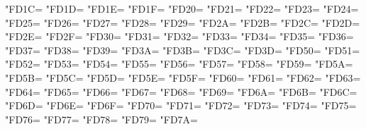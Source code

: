 \XeTeXcharclass"FD1C=\KclassArabU
\XeTeXcharclass"FD1D=\KclassArabU
\XeTeXcharclass"FD1E=\KclassArabU
\XeTeXcharclass"FD1F=\KclassArabU
\XeTeXcharclass"FD20=\KclassArabU
\XeTeXcharclass"FD21=\KclassArabU
\XeTeXcharclass"FD22=\KclassArabU
\XeTeXcharclass"FD23=\KclassArabU
\XeTeXcharclass"FD24=\KclassArabU
\XeTeXcharclass"FD25=\KclassArabU
\XeTeXcharclass"FD26=\KclassArabU
\XeTeXcharclass"FD27=\KclassArabU
\XeTeXcharclass"FD28=\KclassArabU
\XeTeXcharclass"FD29=\KclassArabU
\XeTeXcharclass"FD2A=\KclassArabU
\XeTeXcharclass"FD2B=\KclassArabU
\XeTeXcharclass"FD2C=\KclassArabU
\XeTeXcharclass"FD2D=\KclassArabU
\XeTeXcharclass"FD2E=\KclassArabU
\XeTeXcharclass"FD2F=\KclassArabU
\XeTeXcharclass"FD30=\KclassArabU
\XeTeXcharclass"FD31=\KclassArabU
\XeTeXcharclass"FD32=\KclassArabU
\XeTeXcharclass"FD33=\KclassArabU
\XeTeXcharclass"FD34=\KclassArabU
\XeTeXcharclass"FD35=\KclassArabU
\XeTeXcharclass"FD36=\KclassArabU
\XeTeXcharclass"FD37=\KclassArabU
\XeTeXcharclass"FD38=\KclassArabU
\XeTeXcharclass"FD39=\KclassArabU
\XeTeXcharclass"FD3A=\KclassArabU
\XeTeXcharclass"FD3B=\KclassArabU
\XeTeXcharclass"FD3C=\KclassArabU
\XeTeXcharclass"FD3D=\KclassArabU
\XeTeXcharclass"FD50=\KclassArabU
\XeTeXcharclass"FD51=\KclassArabU
\XeTeXcharclass"FD52=\KclassArabU
\XeTeXcharclass"FD53=\KclassArabU
\XeTeXcharclass"FD54=\KclassArabU
\XeTeXcharclass"FD55=\KclassArabU
\XeTeXcharclass"FD56=\KclassArabU
\XeTeXcharclass"FD57=\KclassArabU
\XeTeXcharclass"FD58=\KclassArabU
\XeTeXcharclass"FD59=\KclassArabU
\XeTeXcharclass"FD5A=\KclassArabU
\XeTeXcharclass"FD5B=\KclassArabU
\XeTeXcharclass"FD5C=\KclassArabU
\XeTeXcharclass"FD5D=\KclassArabU
\XeTeXcharclass"FD5E=\KclassArabU
\XeTeXcharclass"FD5F=\KclassArabU
\XeTeXcharclass"FD60=\KclassArabU
\XeTeXcharclass"FD61=\KclassArabU
\XeTeXcharclass"FD62=\KclassArabU
\XeTeXcharclass"FD63=\KclassArabU
\XeTeXcharclass"FD64=\KclassArabU
\XeTeXcharclass"FD65=\KclassArabU
\XeTeXcharclass"FD66=\KclassArabU
\XeTeXcharclass"FD67=\KclassArabU
\XeTeXcharclass"FD68=\KclassArabU
\XeTeXcharclass"FD69=\KclassArabU
\XeTeXcharclass"FD6A=\KclassArabU
\XeTeXcharclass"FD6B=\KclassArabU
\XeTeXcharclass"FD6C=\KclassArabU
\XeTeXcharclass"FD6D=\KclassArabU
\XeTeXcharclass"FD6E=\KclassArabU
\XeTeXcharclass"FD6F=\KclassArabU
\XeTeXcharclass"FD70=\KclassArabU
\XeTeXcharclass"FD71=\KclassArabU
\XeTeXcharclass"FD72=\KclassArabU
\XeTeXcharclass"FD73=\KclassArabU
\XeTeXcharclass"FD74=\KclassArabU
\XeTeXcharclass"FD75=\KclassArabU
\XeTeXcharclass"FD76=\KclassArabU
\XeTeXcharclass"FD77=\KclassArabU
\XeTeXcharclass"FD78=\KclassArabU
\XeTeXcharclass"FD79=\KclassArabU
\XeTeXcharclass"FD7A=\KclassArabU
